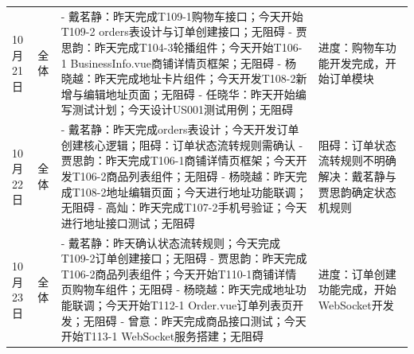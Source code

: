 \begin{levellist}
\begin{longtable}{>{\centering\arraybackslash}m{1cm} >{\centering\arraybackslash}m{1cm} >{\centering\arraybackslash}m{8.5cm} >{\centering\arraybackslash}m{3cm}}
        10月21日                                              & 全体                                                                               & - 戴茗静：昨天完成T109-1购物车接口；今天开始T109-2 orders表设计与订单创建接口；无阻碍 \newline
        - 贾思韵：昨天完成T104-3轮播组件；今天开始T106-1 BusinessInfo.vue商铺详情页框架；无阻碍 \newline
        - 杨晓越：昨天完成地址卡片组件；今天开发T108-2新增与编辑地址页面；无阻碍 \newline
        - 任晓华：昨天开始编写测试计划；今天设计US001测试用例；无阻碍                  & 进度：购物车功能开发完成，开始订单模块                                                                                                                                                                        \\
        10月22日                                              & 全体                                                                               & - 戴茗静：昨天完成orders表设计；今天开发订单创建核心逻辑；阻碍：订单状态流转规则需确认 \newline
        - 贾思韵：昨天完成T106-1商铺详情页框架；今天开发T106-2商品列表组件；无阻碍 \newline
        - 杨晓越：昨天完成T108-2地址编辑页面；今天进行地址功能联调；无阻碍 \newline
        - 高灿：昨天完成T107-2手机号验证；今天进行地址接口测试；无阻碍                 & 阻碍：订单状态流转规则不明确 \newline
        解决：戴茗静与贾思韵确定状态机规则                                                                                                                                                                                                                                \\
        10月23日                                              & 全体                                                                               & - 戴茗静：昨天确认状态流转规则；今天完成T109-2订单创建接口；无阻碍 \newline
        - 贾思韵：昨天完成T106-2商品列表组件；今天开始T110-1商铺详情页购物车组件；无阻碍 \newline
        - 杨晓越：昨天完成地址功能联调；今天开始T112-1 Order.vue订单列表页开发；无阻碍 \newline
        - 曾意：昨天完成商品接口测试；今天开始T113-1 WebSocket服务搭建；无阻碍        & 进度：订单创建功能完成，开始WebSocket开发                                                                                                                                                                  \\

\end{longtable}
\end{levellist}

